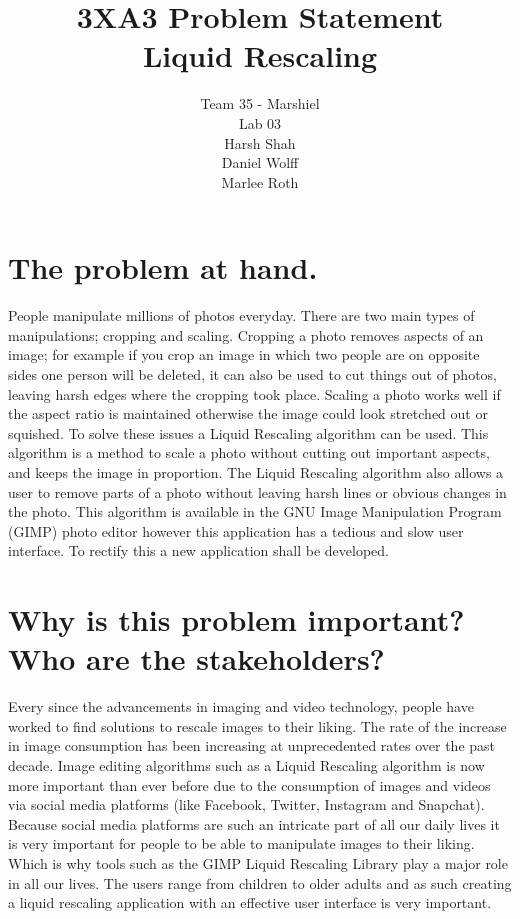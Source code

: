 \documentclass[a4paper]{article}
\title{3XA3 Problem Statement\\
Liquid Rescaling}
\author{Team 35 - Marshiel \\
Lab 03\\
Harsh Shah \\
Daniel Wolff\\
Marlee Roth}
\begin{document}
\maketitle

\section{The problem at hand.}

People manipulate millions of photos everyday. There are two main types of
manipulations; cropping and scaling. Cropping a photo removes aspects of an image; for
example if you crop an image in which two people are on opposite sides one person will be deleted, it can also be used to cut things out of photos, leaving harsh edges where the cropping took place. Scaling a photo works well if the aspect ratio is maintained otherwise the image could look stretched out or squished. To solve these issues a Liquid Rescaling algorithm can be used. This algorithm is a method to scale a photo without cutting out important aspects, and keeps the image in proportion. The Liquid Rescaling algorithm also allows a user to remove parts of a photo without leaving harsh lines or
obvious changes in the photo. This algorithm is available in the GNU Image Manipulation Program (GIMP) photo editor however this application has a tedious and slow user interface. To rectify this  a new application shall be developed. 

\section{Why is this problem important? Who are the stakeholders?}

Every since the advancements in imaging and video technology, people have worked to find solutions to rescale images to their liking. The rate of the increase in image consumption has been increasing at unprecedented rates over the past decade. Image editing algorithms such as a Liquid Rescaling algorithm is now more important than ever before due to the consumption of images and videos via social media platforms (like Facebook, Twitter, Instagram and Snapchat). Because social media platforms are such an intricate part of all our daily lives it is very important for people to be able to manipulate images to their liking. Which is why tools such as the GIMP Liquid Rescaling Library play a major role in all our lives. The users range from children to older adults and as such creating a liquid rescaling application with an effective user interface is very important.
\end{document}

